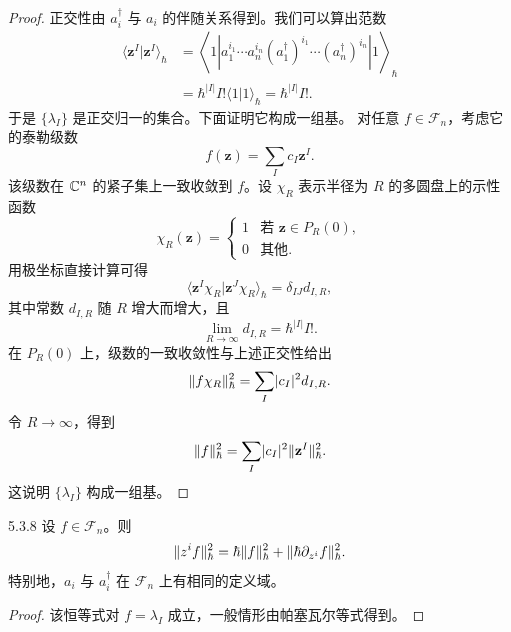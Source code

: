 \begin{proof}
  正交性由 $a_i^\dagger$ 与 $a_i$ 的伴随关系得到。我们可以算出范数
  \[
  \begin{aligned}
  \langle\mathbf z^I|\mathbf z^I\rangle_\hbar
  &=\left\langle 1\left|a_1^{i_1}\cdots a_n^{i_n}
  (a_1^\dagger)^{i_1}\cdots(a_n^\dagger)^{i_n}\right|1\right\rangle_\hbar\\
  &=\hbar^{|I|}I!\langle1|1\rangle_\hbar=\hbar^{|I|}I!.
  \end{aligned}
  \]
  于是 $\{\lambda_I\}$ 是正交归一的集合。下面证明它构成一组基。
  对任意 $f\in\mathcal{F}_n$，考虑它的泰勒级数
  \[
  f(\mathbf z)=\sum_I c_I\mathbf z^I.
  \]
  该级数在 $\mathbb{C}^n$ 的紧子集上一致收敛到 $f$。设 $\chi_R$ 表示半径为 $R$ 的多圆盘上的示性函数
  \[
  \chi_R(\mathbf z)=\begin{cases}
  1 & \text{若 } \mathbf z\in P_R(0),\\
  0 & \text{其他}.
  \end{cases}
  \]
  用极坐标直接计算可得
  \[
  \langle\mathbf z^I\chi_R|\mathbf z^J\chi_R\rangle_\hbar=\delta_{IJ}d_{I,R},
  \]
  其中常数 $d_{I,R}$ 随 $R$ 增大而增大，且
  \[
  \lim_{R\to\infty}d_{I,R}=\hbar^{|I|}I!.
  \]
  在 $P_R(0)$ 上，级数的一致收敛性与上述正交性给出
  \[
  \lVert f\chi_R\rVert_\hbar^2=\sum_I\lvert c_I\rvert^2d_{I,R}.
  \]
  令 $R\to\infty$，得到
  \[
  \lVert f\rVert_\hbar^2=\sum_I\lvert c_I\rvert^2\lVert \mathbf z^I\rVert_\hbar^2.
  \]
  这说明 $\{\lambda_I\}$ 构成一组基。
\end{proof}

\begin{proposition}{5.3.8}
  设 $f\in\mathcal{F}_n$。则
  \[
  \lVert z^if\rVert_\hbar^2=\hbar\lVert f\rVert_\hbar^2+\lVert \hbar\partial_{z^i}f\rVert_\hbar^2.
  \]
  特别地，$a_i$ 与 $a_i^\dagger$ 在 $\mathcal{F}_n$ 上有相同的定义域。
\end{proposition}

\begin{proof}
  该恒等式对 $f=\lambda_I$ 成立，一般情形由帕塞瓦尔等式得到。
\end{proof}

